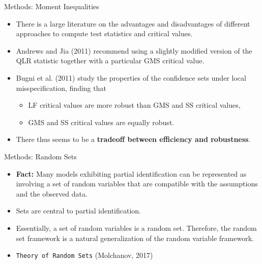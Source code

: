 \documentclass[aspectratio=169]{beamer}  %
\begin{document}
\begin{frame}{Methods: Moment Inequalities}
    \begin{itemize}
        \item There is a large literature on the advantages and disadvantages of
        different approaches to compute test statistics and critical values.
        \item Andrews and Jia (2011) recommend using a slightly modified version
        of the QLR statistic together with a particular GMS critical value.
        \item Bugni et al. (2011) study the properties of the confidence sets under
        local misspecification, finding that
        \begin{itemize}
            \item LF critical values are more robust than GMS and SS critical values,
            \item GMS and SS critical values are equally robust.
        \end{itemize}
        \item There thus seems to be a \textbf{tradeoff between efficiency and robustness}.
    \end{itemize}
\end{frame}


\begin{frame}{Methods: Random Sets}
    \begin{itemize}
        \item \textbf{Fact:} Many models exhibiting partial identification can be represented as involving a set of random variables that are compatible with the assumptions and the observed data.
        \item Sets are central to partial identification.
        \item Essentially, a set of random variables is a random set. Therefore, the random set framework is a natural generalization of the random variable framework.
        \item \texttt{Theory of Random Sets} (Molchanov, 2017)
    \end{itemize}
\end{frame}
\end{document}
